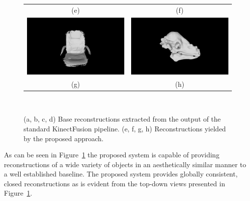\begin{figure}[!htbp]
\begin{tabular}{cc}
    (e) & (f)\\
		\includegraphics[width=.4\linewidth]{figures/object_recon/comp/prob/chair00.png}&
    \includegraphics[width=.4\linewidth]{figures/object_recon/comp/itm/dino00.png} \\
    (g) & (h) \\
  \end{tabular}
  \caption[Probabilistic Object Reconstruction Qualitative Results III]
  {(a, b, c, d) Base reconstructions extracted from the output of the 
  standard KinectFusion pipeline. (e, f, g, h) Reconstructions yielded by 
  the proposed approach.}
~\label{figure:probobj_comp_itm}
\end{figure}

As can be seen in Figure~\ref{figure:probobj_comp_itm} the proposed system is 
capable of providing reconstructions of a wide variety of objects in an 
aesthetically similar manner to a well established baseline. The proposed 
system provides globally consistent, closed reconstructions as is evident from 
the top-down views presented in Figure~\ref{figure:probobj_comp_itm}.

